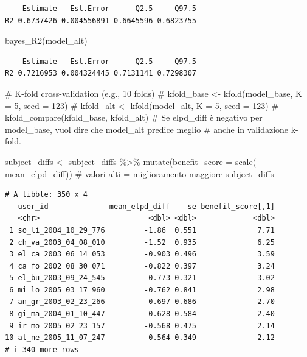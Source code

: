 \documentclass[
  11pt,
  a4paper,
  onecolumn]{article}
\newenvironment{Shaded}{}{}
\newcommand{\AttributeTok}[1]{\textcolor[rgb]{0.84,0.23,0.29}{#1}}
\newcommand{\CommentTok}[1]{\textcolor[rgb]{0.42,0.45,0.49}{#1}}
\newcommand{\FunctionTok}[1]{\textcolor[rgb]{0.44,0.26,0.76}{#1}}
\newcommand{\NormalTok}[1]{\textcolor[rgb]{0.14,0.16,0.18}{#1}}
\newcommand{\OtherTok}[1]{\textcolor[rgb]{0.44,0.26,0.76}{#1}}
\newcommand{\SpecialCharTok}[1]{\textcolor[rgb]{0.00,0.36,0.77}{#1}}
\begin{document}
\begin{verbatim}
    Estimate   Est.Error      Q2.5     Q97.5
R2 0.6737426 0.004556891 0.6645596 0.6823755
\end{verbatim}

\begin{Shaded}
\begin{Highlighting}[]
\FunctionTok{bayes\_R2}\NormalTok{(model\_alt)}
\end{Highlighting}
\end{Shaded}

\begin{verbatim}
    Estimate   Est.Error      Q2.5     Q97.5
R2 0.7216953 0.004324445 0.7131141 0.7298307
\end{verbatim}

\begin{Shaded}
\begin{Highlighting}[]
\CommentTok{\# K{-}fold cross{-}validation (e.g., 10 folds)}
\CommentTok{\# kfold\_base \textless{}{-} kfold(model\_base, K = 5, seed = 123)}
\CommentTok{\# kfold\_alt  \textless{}{-} kfold(model\_alt,  K = 5, seed = 123)}
\CommentTok{\# kfold\_compare(kfold\_base, kfold\_alt)}
\CommentTok{\# Se elpd\_diff è negativo per model\_base, vuol dire che model\_alt predice meglio }
\CommentTok{\# anche in validazione k{-}fold.}
\end{Highlighting}
\end{Shaded}

\begin{Shaded}
\begin{Highlighting}[]
\NormalTok{subject\_diffs }\OtherTok{\textless{}{-}}\NormalTok{ subject\_diffs }\SpecialCharTok{\%\textgreater{}\%}
  \FunctionTok{mutate}\NormalTok{(}\AttributeTok{benefit\_score =} \FunctionTok{scale}\NormalTok{(}\SpecialCharTok{{-}}\NormalTok{mean\_elpd\_diff)) }
\CommentTok{\# valori alti = miglioramento maggiore}
\NormalTok{subject\_diffs}
\end{Highlighting}
\end{Shaded}

\begin{verbatim}
# A tibble: 350 x 4
   user_id              mean_elpd_diff    se benefit_score[,1]
   <chr>                         <dbl> <dbl>             <dbl>
 1 so_li_2004_10_29_776         -1.86  0.551              7.71
 2 ch_va_2003_04_08_010         -1.52  0.935              6.25
 3 el_ca_2003_06_14_053         -0.903 0.496              3.59
 4 ca_fo_2002_08_30_071         -0.822 0.397              3.24
 5 el_bu_2003_09_24_545         -0.773 0.321              3.02
 6 mi_lo_2005_03_17_960         -0.762 0.841              2.98
 7 an_gr_2003_02_23_266         -0.697 0.686              2.70
 8 gi_ma_2004_01_10_447         -0.628 0.584              2.40
 9 ir_mo_2005_02_23_157         -0.568 0.475              2.14
10 al_ne_2005_11_07_247         -0.564 0.349              2.12
# i 340 more rows
\end{verbatim}
\end{document}
